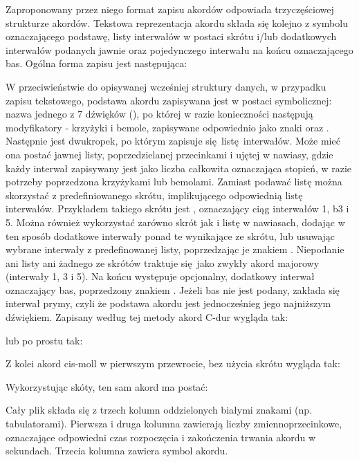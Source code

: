 Zaproponowany przez niego format zapisu akordów odpowiada trzyczęściowej strukturze akordów.
Tekstowa reprezentacja akordu składa się kolejno z symbolu oznaczającego podstawę, listy interwałów
w postaci skrótu i/lub dodatkowych interwałów podanych jawnie oraz pojedynczego interwału na końcu
oznaczającego bas. Ogólna forma zapisu jest następująca: 
\begin{center}
\end{center}
W przeciwieństwie do opisywanej wcześniej struktury danych, w przypadku zapisu tekstowego, podstawa
akordu zapisywana jest w postaci symbolicznej: nazwa jednego z 7 dźwięków (), po której w
razie konieczności następują modyfikatory - krzyżyki i bemole, zapisywane odpowiednio jako znaki
\code{\#} oraz . Następnie jest dwukropek, po którym zapisuje się listę interwałów. Może mieć ona
postać jawnej listy, poprzedzielanej przecinkami i ujętej w nawiasy, gdzie każdy interwał zapisywany
jest jako liczba całkowita oznaczająca stopień, w razie potrzeby poprzedzona krzyżykami lub
bemolami. Zamiast podawać listę można skorzystać z predefiniowanego skrótu, implikującego
odpowiednią listę interwałów. Przykładem takiego skrótu jest , oznaczający ciąg interwałów
1, b3 i 5. Można również wykorzystać zarówno skrót jak i listę w nawiasach, dodając w ten
sposób dodatkowe interwały ponad te wynikające ze skrótu, lub usuwając wybrane interwały z
predefinowanej listy, poprzedzając je znakiem \code{*}. Niepodanie ani listy ani żadnego ze skrótów
traktuje się jako zwykły akord majorowy (interwały 1, 3 i 5). Na końcu występuje opcjonalny,
dodatkowy interwał oznaczający bas, poprzedzony znakiem \code{/}. Jeżeli bas nie jest podany, zakłada
się interwał prymy, czyli że podstawa akordu jest jednocześnieg jego najniższym dźwiękiem. Zapisany
według tej metody akord C-dur wygląda tak:
\begin{center}
\end{center}
lub po prostu tak:
\begin{center}
\end{center}
Z kolei akord cis-moll w pierwszym przewrocie, bez użycia skrótu wygląda tak:
\begin{center}
\end{center}
Wykorzystując skóty, ten sam akord ma postać:
\begin{center}
\end{center}
Cały plik  składa się z trzech kolumn oddzielonych białymi znakami (np. tabulatorami).
Pierwsza i druga kolumna zawierają liczby zmiennoprzecinkowe, oznaczające odpowiedni czas
rozpoczęcia i zakończenia trwania akordu w sekundach. Trzecia kolumna zawiera symbol akordu.

